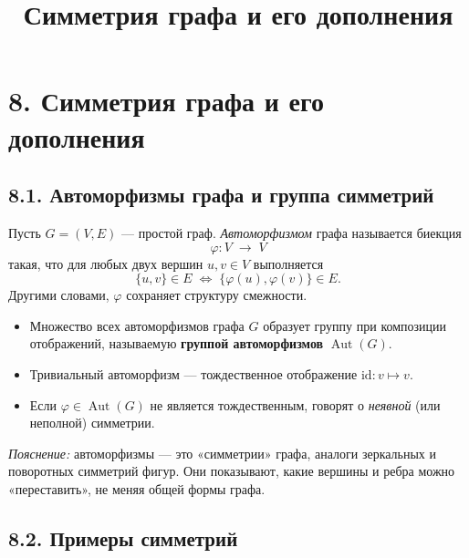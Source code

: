 \documentclass{article}
\begin{document}
\title{Симметрия графа и его дополнения}
\author{}
\date{}
\makeatletter
\renewcommand{\maketitle}{
  \begin{center}
    {\Large\mdseries\@title\par}
    \vspace{0.5em}
  \end{center}
}
\makeatother
\maketitle

\section*{8. Симметрия графа и его дополнения}

\subsection*{8.1. Автоморфизмы графа и группа симметрий}

Пусть $G=(V,E)$ — простой граф. \emph{Автоморфизмом} графа называется биекция
\[
  \varphi\colon V\;\to\;V
\]
такая, что для любых двух вершин $u,v\in V$ выполняется
\[
  \{u,v\}\in E \;\iff\;\{\varphi(u),\varphi(v)\}\in E.
\]
Другими словами, $\varphi$ сохраняет структуру смежности.

\begin{itemize}[leftmargin=*]
  \item Множество всех автоморфизмов графа $G$ образует группу при композиции отображений, называемую \textbf{группой автоморфизмов} $\operatorname{Aut}(G)$.
  \item Тривиальный автоморфизм — тождественное отображение $\mathrm{id}:v\mapsto v$.
  \item Если $\varphi\in\operatorname{Aut}(G)$ не является тождественным, говорят о \emph{неявной} (или неполной) симметрии.
\end{itemize}

\emph{Пояснение:} автоморфизмы — это «симметрии» графа, аналоги зеркальных и поворотных симметрий фигур. Они показывают, какие вершины и ребра можно «переставить», не меняя общей формы графа.

\subsection*{8.2. Примеры симметрий}
\end{document}
